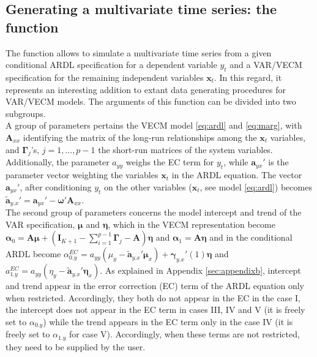 \subsection{Generating a multivariate time series: the  function}
The function  allows to simulate a multivariate time series from a given conditional ARDL specification for a dependent variable $y_t$ and a VAR/VECM specification for the remaining independent variables $\mathbf{x}_t$. In this regard, it represents an interesting addition to extant data generating procedures for VAR/VECM models. The arguments of this function can be divided into two subgroups.\\
A group of parameters pertains the VECM model \eqref{eq:ardl} and \eqref{eq:marg}, with $\mathbf{A}_{xx}$ identifying the matrix of the long-run relationships among the $\mathbf x_t$ variables, and 
 $\boldsymbol\Gamma_j$'s, $j=1,...,p-1$ the short-run matrices of the system variables. Additionally, the parameter $a_{yy}$ weighs the EC term for $y_t$, 
while $\mathbf{a}_{yx}'$ is the parameter vector weighting the variables $\mathbf{x}_{t}$ in the ARDL equation. The vector $\mathbf{a}_{yx}'$, after conditioning $y_t$ on the other variables ($\mathbf{x}_t$, see model \ref{eq:ardl}) becomes $\widetilde{\mathbf{a}}_{y.x}' = \mathbf{a}_{yx}' - \boldsymbol\omega'\mathbf{A}_{xx}$.\\
The second group of parameters concerns the model intercept and trend of the VAR specification, $\boldsymbol\mu$ and $\boldsymbol\eta$, which in 
the VECM representation become $\boldsymbol\alpha_0 = \mathbf A \boldsymbol\mu + (\mathbf I_{K+1} - \sum_{i=1}^{p-1} \boldsymbol\Gamma_j-\mathbf A)\boldsymbol\eta$ and $\boldsymbol{\alpha}_1 = \mathbf A \boldsymbol\eta$ and in the conditional ARDL become $\alpha_{0.y}^{EC}= a_{yy}(\mu_{y}-\widetilde{\mathbf{ a}}_{y.x}'\boldsymbol \mu_{x})+\boldsymbol\gamma_{y.x}'(1)\boldsymbol\eta$ and $a_{1.y}^{EC}=a_{yy}(\eta_y-\widetilde{\mathbf{ a}}_{y.x}'\boldsymbol\eta_x)$. As explained in Appendix \ref{sec:appendixb}, intercept and trend appear in the error correction (EC) term of the ARDL equation only when restricted. Accordingly, they both do not appear in the EC in the case I, the intercept does not appear in the EC term in cases III, IV and V (it is freely set to $\alpha_{0.y}$) while the trend appears in the EC term only in the case IV (it is freely set to $\alpha_{1.y}$ for case V). Accordingly, when these terms are not restricted, they need to be supplied by the user.\\

